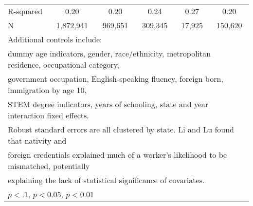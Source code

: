 \begin{table}[htbp]
\begin{tabular}{l*{5}{c}}
R-squared           &        0.20         &        0.20         &        0.24         &        0.27         &        0.20         \\
N                   &   1,872,941         &     969,651         &     309,345         &      17,925         &     150,620         \\
\bottomrule
\multicolumn{6}{l}{\footnotesize Additional controls include:}\\
\multicolumn{6}{l}{\footnotesize dummy age indicators, gender, race/ethnicity, metropolitan residence, occupational category,}\\
\multicolumn{6}{l}{\footnotesize government occupation, English-speaking fluency, foreign born, immigration by age 10,}\\
\multicolumn{6}{l}{\footnotesize STEM degree indicators, years of schooling, state and year interaction fixed effects.}\\
\multicolumn{6}{l}{\footnotesize Robust standard errors are all clustered by state. Li and Lu found that nativity and}\\
\multicolumn{6}{l}{\footnotesize foreign credentials explained much of a worker's likelihood to be mismatched, potentially}\\
\multicolumn{6}{l}{\footnotesize explaining the lack of statistical significance of covariates.}\\
\multicolumn{6}{l}{\footnotesize \sym{*} \(p<.1\), \sym{**} \(p<0.05\), \sym{***} \(p<0.01\)}\\
\end{tabular}
\end{table}
